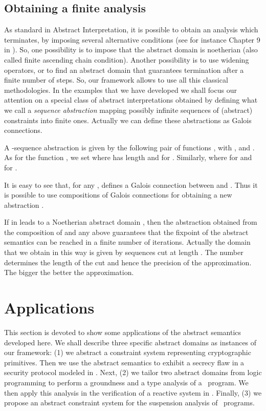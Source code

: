 \documentclass{tlp}
\begin{document}
\subsection{Obtaining a finite analysis}
As standard in Abstract Interpretation, it is possible to obtain an 
analysis which terminates, by imposing several alternative conditions 
(see for instance Chapter 9 in \cite{CC92}).
So, one possibility is to impose that the abstract domain is 
noetherian (also called finite ascending chain condition). Another 
possibility is to use widening operators, or to find an abstract 
domain that guarantees termination after a finite number of steps. So, our framework allows to 
use all this classical methodologies.
In the examples that we have developed 
we shall focus our attention on a special class of abstract interpretations 
obtained 
by defining 
what we call a \emph{sequence abstraction} mapping possibly infinite sequences of (abstract) 
constraints into finite ones. Actually we can define these 
abstractions 
as Galois connections.

\begin{definition}
A -sequence abstraction  is given by the
following pair of functions , with 
, 
and .
As for  the function , we set  where  has length   and  for . Similarly,   where  for  and  for .
\end{definition}

It is easy to see that, for any ,  
defines 
a Galois connection between  and .
Thus it is possible to use compositions of Galois connections for 
obtaining a new abstraction \cite{CC92}.

If  in  leads to a  Noetherian abstract domain , 
then the abstraction obtained from the composition of  and any 
 above guarantees that the fixpoint of  the abstract semantics 
can be reached in a finite number of iterations. 
Actually the domain that we obtain in this way is given by  
sequences cut at length . The number  determines the length of 
the cut and hence the precision of the approximation. The bigger  
the better the approximation.









\section{Applications}\label{sec:app}
This section is devoted to show some applications of the abstract semantics developed here. We shall describe  three specific abstract domains as instances of our framework: (1) we abstract a constraint  system  representing cryptographic primitives.  Then we use the  abstract  semantics to exhibit a secrecy flaw in a security protocol modeled in \utcc.   Next, (2) we tailor two abstract domains from logic programming to perform a  groundness 
and a type analysis of a \tccp\ program. We then apply this analysis in the verification of a reactive system in \tccp. Finally, (3) we propose an abstract constraint system for the suspension analysis of \tccp\ programs. 
\end{document}
